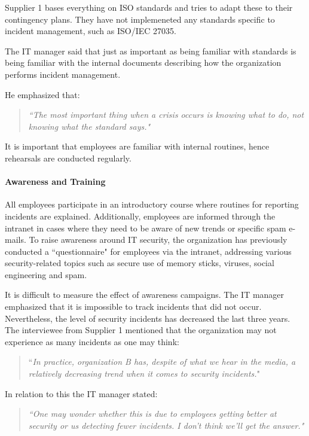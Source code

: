 Supplier 1 bases everything on \acs{ISO} standards and tries to adapt these to their contingency plans. They have not implemeneted any standards specific to incident management, such as \acs{ISO}/\acs{IEC} 27035. 

The IT manager said that just as important as being familiar with standards is being familiar with the internal documents describing how the organization performs incident management. 

He emphasized that:
\begin{quote}
\textit{``The most important thing when a crisis occurs is knowing what to do, not knowing what the standard says."}
\end{quote}
It is important that employees are familiar with internal routines, hence rehearsals are conducted regularly.

\paragraph{Awareness and Training}
All employees participate in an introductory course where routines for reporting incidents are explained. Additionally, employees are informed through the intranet in cases where they need to be aware of new trends or specific spam e-mails. To raise awareness around IT security, the organization has previously conducted a ``questionnaire" for employees via the intranet, addressing various security-related topics such as secure use of memory sticks, viruses, social engineering and spam. 

It is difficult to measure the effect of awareness campaigns. The IT manager emphasized that it is impossible to track incidents that did not occur. Nevertheless, the level of security incidents has decreased the last three years. The interviewee from Supplier 1 mentioned that the organization may not experience as many incidents as one may think: 

\begin{quote}
``\textit{In practice, organization B has, despite of what we hear in the media, a relatively decreasing trend when it comes to security incidents.}"
\end{quote} 

In relation to this the IT manager stated:

\begin{quote}
\textit{``One may wonder whether this is due to employees getting better at security or us detecting fewer incidents. I don't think we'll get the answer."}
\end{quote}
 
